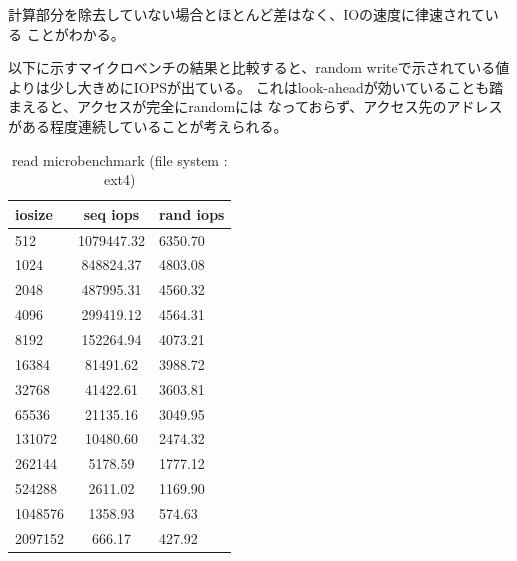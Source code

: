 \documentclass[11pt,a4paper]{jsarticle}
\begin{document}
計算部分を除去していない場合とほとんど差はなく、IOの速度に律速されている
ことがわかる。

以下に示すマイクロベンチの結果と比較すると、random writeで示されている値
よりは少し大きめにIOPSが出ている。
これはlook-aheadが効いていることも踏まえると、アクセスが完全にrandomには
なっておらず、アクセス先のアドレスがある程度連続していることが考えられる。

\begin{table}[thbp]
 \caption{read microbenchmark (file system : ext4)}
 \label{tb:rmicro}
 \begin{center}
  \begin{tabular}{lcl}\hline
   iosize & seq iops & rand iops \\ \hline
   512 & 1079447.32 & 6350.70 \\
   1024 & 848824.37 & 4803.08 \\
   2048 & 487995.31 & 4560.32 \\
   4096 & 299419.12 & 4564.31 \\
   \color{red}8192 & \color{red}152264.94 & \color{red}4073.21 \\
   16384 & 81491.62 & 3988.72 \\
   32768 & 41422.61 & 3603.81 \\
   65536 & 21135.16 & 3049.95 \\
   131072 & 10480.60 & 2474.32 \\
   262144 & 5178.59 & 1777.12 \\
   524288 & 2611.02 & 1169.90 \\
   1048576 & 1358.93 & 574.63 \\
   2097152 & 666.17 & 427.92 \\ \hline
  \end{tabular}
 \end{center}
\end{table}
\end{document}
